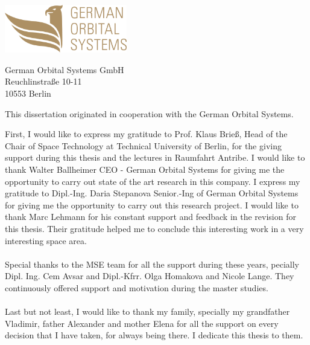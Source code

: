 \thispagestyle{empty}
\vspace*{3cm}


\begin{center}
\includegraphics[width=0.4\textwidth]{logo.png}
\end{center}

\vspace*{0.2cm}

\begin{center}
German Orbital Systems GmbH\\
Reuchlinstraße 10-11\\
10553 Berlin\\
\end{center}
\vspace*{0.5cm}

\noindent This dissertation originated in cooperation with the German Orbital Systems.

\vspace*{1cm}
\noindent 
First, I would like to express my gratitude to Prof. Klaus Brieß, Head of the Chair of Space
Technology at Technical University of Berlin, for the giving support during this thesis and
the lectures in Raumfahrt Antribe.
I would like to thank Walter Ballheimer CEO - German Orbital Systems for giving me the opportunity to carry out state of the art research in this company. I express my gratitude to Dipl.-Ing. Daria Stepanova Senior.-Ing of German Orbital Systems for giving me
the opportunity to carry out this research project. I would like to thank Marc Lehmann for his constant support and feedback in the revision  for this thesis. Their gratitude helped me to conclude this interesting work in a very interesting space area.
\\
\\
Special thanks to the MSE team for all the support during these years,  pecially Dipl.
Ing. Cem Avsar and Dipl.-Kfrr. Olga Homakova and Nicole Lange. They continuously offered support and
motivation during the master studies.
\\
\\
Last but not least, I would like to thank my family, specially my grandfather Vladimir, father Alexander
and mother Elena for all the support on every decision that I have taken, for always being
there. I dedicate this thesis to them.